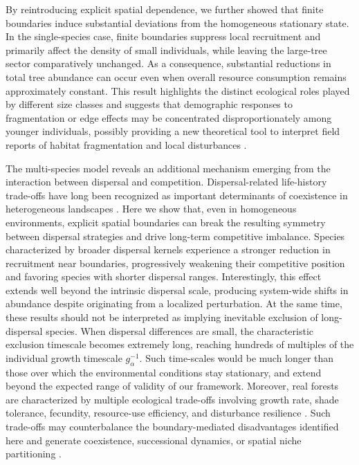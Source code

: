 \documentclass[aps,pre,twocolumn,superscriptaddress,10pt]{revtex4-2}
\begin{document}
By reintroducing explicit spatial dependence, we further showed that finite boundaries induce substantial deviations from the homogeneous stationary state. In the single-species case, finite boundaries suppress local recruitment and primarily affect the density of small individuals, while leaving the large-tree sector comparatively unchanged. As a consequence, substantial reductions in total tree abundance can occur even when overall resource consumption remains approximately constant. This result highlights the distinct ecological roles played by different size classes and suggests that demographic responses to fragmentation or edge effects may be concentrated disproportionately among younger individuals, possibly providing a new theoretical tool to interpret field reports of habitat fragmentation and local disturbances \cite{Laurance1998Recruitment,Ewers2006,NunezAvila2013}. 
    
The multi-species model reveals an additional mechanism emerging from the interaction between dispersal and competition.  Dispersal-related life-history trade-offs have long been recognized as important determinants of coexistence in heterogeneous landscapes \cite{D_Andrea_JODwyer_2021}. Here we show that, even in homogeneous environments, explicit spatial boundaries can break the resulting symmetry between dispersal strategies and drive long-term competitive imbalance.
Species characterized by broader dispersal kernels experience a stronger reduction in recruitment near boundaries, progressively weakening their competitive position and favoring species with shorter dispersal ranges. Interestingly, this effect extends well beyond the intrinsic dispersal scale, producing system-wide shifts in abundance despite originating from a localized perturbation. At the same time, these results should not be interpreted as implying inevitable exclusion of long-dispersal species. When dispersal differences are small, the characteristic exclusion timescale becomes extremely long, reaching hundreds of multiples of the individual growth timescale $g_\alpha^{-1}$. Such time-scales would be much longer than those over which the environmental conditions stay stationary, and extend beyond the expected range of validity of our framework.
Moreover, real forests are characterized by multiple ecological trade-offs involving growth rate, shade tolerance, fecundity, resource-use efficiency, and disturbance resilience \cite{Westoby1996,MullerLandau2010,Diaz2015}. Such trade-offs may counterbalance the boundary-mediated disadvantages identified here and generate coexistence, successional dynamics, or spatial niche partitioning \cite{Levine2009,Wright2010,Adler2014,Jops2023}.
\end{document}

